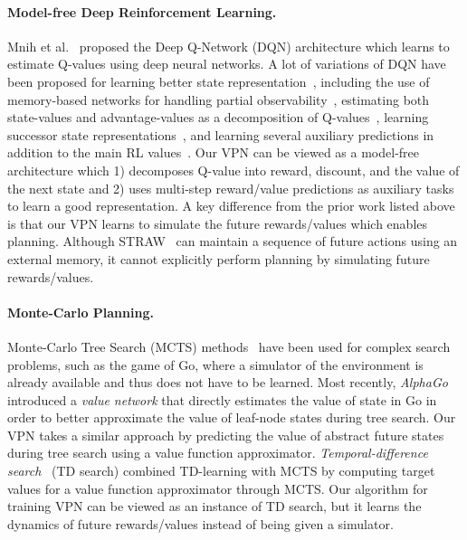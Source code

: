 \documentclass{article}
\newcommand{\cutparagraphup}{\vspace{-2pt}}
\begin{document}
\paragraph{Model-free Deep Reinforcement Learning.}
Mnih et al.~\cite{mnih2015human} proposed the Deep Q-Network (DQN) architecture which learns to estimate Q-values using deep neural networks. A lot of variations of DQN have been proposed for learning better state representation~\cite{Wang2016DuelingNA,Kulkarni2016DeepSR,Hausknecht2015DeepRQ,Oh2016ControlOM,Vezhnevets2016StrategicAW,Parisotto2017NeuralMS}, including the use of memory-based networks for handling partial observability~\cite{Hausknecht2015DeepRQ,Oh2016ControlOM,Parisotto2017NeuralMS}, estimating both state-values and advantage-values as a decomposition of Q-values~\cite{Wang2016DuelingNA}, learning successor state representations~\cite{Kulkarni2016DeepSR}, and 
learning several auxiliary predictions in addition to the main RL values~\cite{Jaderberg2016ReinforcementLW}.
Our VPN can be viewed as a model-free architecture which 1) decomposes Q-value into reward, discount, and the value of the next state and 2) uses multi-step reward/value predictions as auxiliary tasks to learn a good representation. A key difference from the prior work listed above is that our VPN learns to simulate the future rewards/values which enables planning.
Although STRAW~\cite{Vezhnevets2016StrategicAW} can maintain a sequence of future actions using an external memory, it cannot explicitly perform planning by simulating future rewards/values.

\cutparagraphup
\paragraph{Monte-Carlo Planning.} 
Monte-Carlo Tree Search (MCTS) methods~\citep{kocsis2006bandit,browne2012survey} have been used for complex search problems, such as the game of Go, where a simulator of the environment is already available and thus does not have to be learned. Most recently, \textit{AlphaGo}~\cite{silver2016mastering} introduced a \textit{value network} that directly estimates the value of state in Go in order to better approximate the value of leaf-node states during tree search. Our VPN takes a similar approach by predicting the value of abstract future states during tree search using a value function approximator. \textit{Temporal-difference search}~\cite{Silver2012TemporaldifferenceSI} (TD search) combined TD-learning with MCTS by computing target values for a value function approximator through MCTS. Our algorithm for training VPN can be viewed as an instance of TD search, but it learns the dynamics of future rewards/values instead of being given a simulator.
\end{document}
